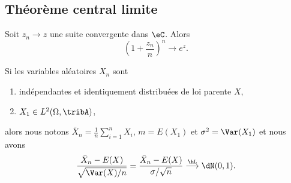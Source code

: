 \subsection{Théorème central limite}

\begin{lemma}       \label{Lemexpznznsurnton}
    Soit \( z_n\to z\) une suite convergente dans \( \eC\). Alors
    \begin{equation}
        \left( 1+\frac{ z_n }{ n } \right)^n\to e^z.
    \end{equation}
\end{lemma}

\begin{theorem}
    Si les variables aléatoires \( X_n\) sont
    \begin{enumerate}
        \item
            indépendantes et identiquement distribuées de loi parente \( X\),
        \item
            \( X_1\in L^2(\Omega,\tribA)\),
    \end{enumerate}
    alors nous notons \( \bar X_n=\frac{1}{ n }\sum_{i=1}^{n}X_i\), \( m=E(X_1)\) et \( \sigma^2=\Var(X_1)\) et nous avons
    \begin{equation}
        \frac{ \bar X_n-E(X) }{ \sqrt{\Var(X)/n} }=\frac{ \bar X_n-E(X) }{ \sigma/\sqrt{n} }\stackrel{\hL}{\longrightarrow}\dN(0,1).
    \end{equation}
    
\end{theorem}

